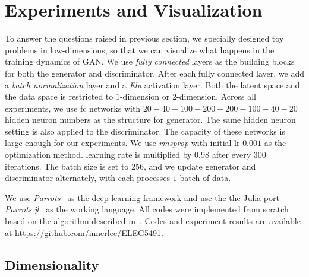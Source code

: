 \section{Experiments and Visualization} \label{sec:exp}

To answer the questions raised in previous section,
we specially designed toy problems in low-dimensions,
so that we can visualize what happens in the training dynamics of GAN.
We use \emph{fully connected} layers as the building blocks for both
the generator and discriminator.
After each fully connected layer,
we add a \emph{batch normalization} layer and a \emph{Elu} activation layer.
Both the latent space and the data space is
restricted to $1$-dimension or $2$-dimension.
Across all experiments,
we use fc networks with
$20-40-100-200-200-100-40-20$ hidden neuron numbers
as the structure for generator.
The same hidden neuron setting is also applied to the discriminator.
The capacity of these networks is large enough for our experiments.
We use \emph{rmsprop} with initial lr $0.001$ as the optimization method.
learning rate is multiplied by $0.98$ after every $300$ iterations.
The batch size is set to $256$,
and we update generator and discriminator alternately,
with each processes $1$ batch of data.

We use \emph{Parrots}~\cite{parrots} as the deep learning framework
and use the the Julia port \emph{Parrots.jl}~\cite{parrotsjl}
as the working language.
All codes were implemented from scratch based on
the algorithm described in~\cite{goodfellow2014generative}.
Codes and experiment results are available at
\url{https://github.com/innerlee/ELEG5491}.

\subsection{Dimensionality}

